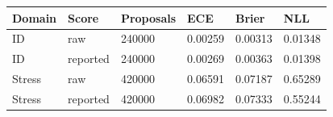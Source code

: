 \begin{tabular}{llllll}
\toprule
Domain & Score & Proposals & ECE & Brier & NLL \\
\midrule
ID & raw & 240000 & 0.00259 & 0.00313 & 0.01348 \\
ID & reported & 240000 & 0.00269 & 0.00363 & 0.01398 \\
Stress & raw & 420000 & 0.06591 & 0.07187 & 0.65289 \\
Stress & reported & 420000 & 0.06982 & 0.07333 & 0.55244 \\
\bottomrule
\end{tabular}

